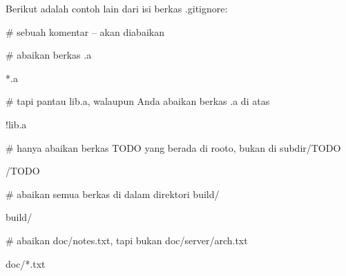 \noindent 
Berikut adalah contoh lain dari isi berkas .gitignore: \par
\noindent 
 $  \#  $ sebuah komentar – akan diabaikan \par
\noindent 
 $  \#  $ abaikan berkas .a \par
\noindent 
*.a \par
\noindent 
 $  \#  $ tapi pantau lib.a, walaupun Anda abaikan berkas .a di atas \par
\noindent 
!lib.a \par
\noindent 
 $  \#  $ hanya abaikan berkas TODO yang berada di rooto, bukan di subdir/TODO \par
\noindent 
/TODO \par
\noindent 
 $  \#  $ abaikan semua berkas di dalam direktori build/ \par
\noindent 
build/ \par
\noindent 
 $  \#  $ abaikan doc/notes.txt, tapi bukan doc/server/arch.txt \par
\noindent 
doc/*.txt \par


